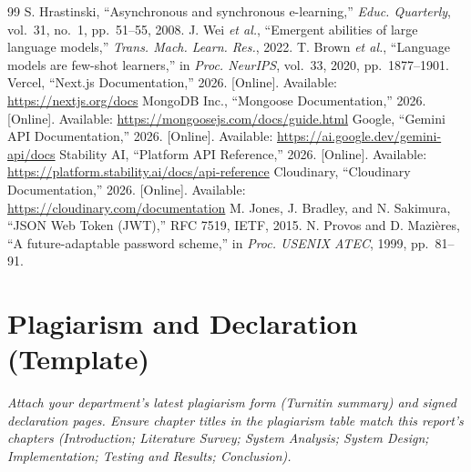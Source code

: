 \documentclass[a4paper,12pt,openany]{report}
\begin{document}
\begin{thebibliography}{99}
 S. Hrastinski, ``Asynchronous and synchronous e-learning,'' \textit{Educ. Quarterly}, vol.~31, no.~1, pp.~51--55, 2008.
 J. Wei \textit{et al.}, ``Emergent abilities of large language models,'' \textit{Trans. Mach. Learn. Res.}, 2022.
 T. Brown \textit{et al.}, ``Language models are few-shot learners,'' in \textit{Proc. NeurIPS}, vol.~33, 2020, pp.~1877--1901.
 Vercel, ``Next.js Documentation,'' 2026. [Online]. Available: \url{https://nextjs.org/docs}
 MongoDB Inc., ``Mongoose Documentation,'' 2026. [Online]. Available: \url{https://mongoosejs.com/docs/guide.html}
 Google, ``Gemini API Documentation,'' 2026. [Online]. Available: \url{https://ai.google.dev/gemini-api/docs}
 Stability AI, ``Platform API Reference,'' 2026. [Online]. Available: \url{https://platform.stability.ai/docs/api-reference}
 Cloudinary, ``Cloudinary Documentation,'' 2026. [Online]. Available: \url{https://cloudinary.com/documentation}
 M. Jones, J. Bradley, and N. Sakimura, ``JSON Web Token (JWT),'' RFC 7519, IETF, 2015.
 N. Provos and D. Mazi\`{e}res, ``A future-adaptable password scheme,'' in \textit{Proc. USENIX ATEC}, 1999, pp.~81--91.
\end{thebibliography}

\appendix
\chapter{Plagiarism and Declaration (Template)}
\textit{Attach your department's latest plagiarism form (Turnitin summary) and signed declaration pages. Ensure chapter titles in the plagiarism table match this report's chapters (Introduction; Literature Survey; System Analysis; System Design; Implementation; Testing and Results; Conclusion).}
\end{document}
